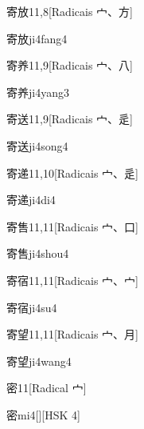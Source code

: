 \begin{entry}{寄放}{11,8}[Radicais ⼧、⽅]
  \begin{phonetics}{寄放}{ji4fang4}
  \end{phonetics}
\end{entry}

\begin{entry}{寄养}{11,9}[Radicais ⼧、⼋]
  \begin{phonetics}{寄养}{ji4yang3}
  \end{phonetics}
\end{entry}

\begin{entry}{寄送}{11,9}[Radicais ⼧、⾡]
  \begin{phonetics}{寄送}{ji4song4}
  \end{phonetics}
\end{entry}

\begin{entry}{寄递}{11,10}[Radicais ⼧、⾡]
  \begin{phonetics}{寄递}{ji4di4}
  \end{phonetics}
\end{entry}

\begin{entry}{寄售}{11,11}[Radicais ⼧、⼝]
  \begin{phonetics}{寄售}{ji4shou4}
  \end{phonetics}
\end{entry}

\begin{entry}{寄宿}{11,11}[Radicais ⼧、⼧]
  \begin{phonetics}{寄宿}{ji4su4}
  \end{phonetics}
\end{entry}

\begin{entry}{寄望}{11,11}[Radicais ⼧、⽉]
  \begin{phonetics}{寄望}{ji4wang4}
  \end{phonetics}
\end{entry}

\begin{entry}{密}{11}[Radical ⼧]
  \begin{phonetics}{密}{mi4}[][HSK 4]
  \end{phonetics}
\end{entry}

